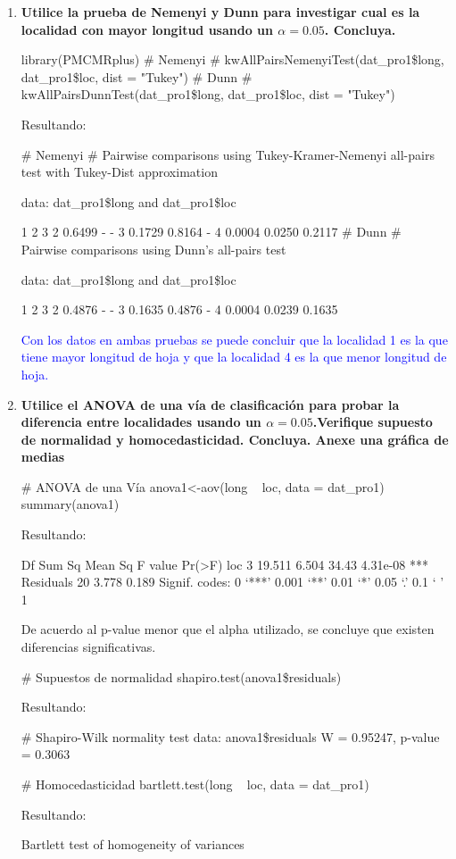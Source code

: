 \documentclass[a4paper,12pt]{article}
\begin{document}
\begin{enumerate} [label=\textbf{\alph*})]
\begin{MyVerbatim}
data:  long by loc
Kruskal-Wallis chi-squared = 16.974, df = 3, p-value = 0.0007155
\end{MyVerbatim}
\textcolor{blue}{
Se concluye que hay diferencias estadísticamente significativas en la longitud de las hojas entre las localidades.}
\item {\textbf{Utilice la prueba de Nemenyi y Dunn para investigar cual es la localidad con mayor longitud usando un  \( \alpha = 0.05 \). Concluya.}}
	\begin{MyVerbatim}
library(PMCMRplus)
# Nemenyi #
kwAllPairsNemenyiTest(dat\_pro1\$long, dat\_pro1\$loc, dist = "Tukey")	
# Dunn #
kwAllPairsDunnTest(dat\_pro1\$long, dat_pro1\$loc, dist = "Tukey")
\end{MyVerbatim}
			Resultando: 
	\begin{MyVerbatim}
# Nemenyi #
Pairwise comparisons using Tukey-Kramer-Nemenyi all-pairs test with 
Tukey-Dist approximation

data: dat_pro1\$long and dat\_pro1\$loc

1      2      3     
2 0.6499 -      -     
3 0.1729 0.8164 -     
4 0.0004 0.0250 0.2117
# Dunn #
Pairwise comparisons using Dunn's all-pairs test

data: dat\_pro1\$long and dat\_pro1\$loc

1      2      3     
2 0.4876 -      -     
3 0.1635 0.4876 -     
4 0.0004 0.0239 0.1635
\end{MyVerbatim}
\textcolor{blue}{Con los datos en ambas pruebas se puede concluir que la localidad 1 es la que tiene mayor longitud de hoja y que la localidad 4 es la que menor longitud de hoja.}
\item {\textbf{Utilice el ANOVA de una vía de clasificación para probar la diferencia entre localidades usando un \( \alpha = 0.05 \).Verifique supuesto de normalidad y homocedasticidad. Concluya. Anexe una gráfica de medias}}
	\begin{MyVerbatim}
# ANOVA de una Vía 
anova1<-aov(long ~ loc, data = dat\_pro1)
summary(anova1)	
	\end{MyVerbatim}
Resultando:
	\begin{MyVerbatim}
Df Sum Sq Mean Sq F value   Pr(>F)    
loc          3 19.511   6.504   34.43 4.31e-08 ***
Residuals   20  3.778   0.189                     
Signif. codes:  0 ‘***’ 0.001 ‘**’ 0.01 ‘*’ 0.05 ‘.’ 0.1 ‘ ’ 1
	\end{MyVerbatim}
De acuerdo al p-value menor que el alpha utilizado, se concluye que existen diferencias significativas.
\begin{MyVerbatim}
# Supuestos de normalidad
	shapiro.test(anova1\$residuals)
\end{MyVerbatim}
Resultando:
	\begin{MyVerbatim}
# Shapiro-Wilk normality test
	data:  anova1\$residuals
	W = 0.95247, p-value = 0.3063
	\end{MyVerbatim}
	\begin{MyVerbatim}
# Homocedasticidad
bartlett.test(long ~ loc, data = dat\_pro1)
	\end{MyVerbatim}
Resultando:
\begin{MyVerbatim}
	Bartlett test of homogeneity of variances
	

\end{MyVerbatim}
\end{enumerate}
\end{document}
